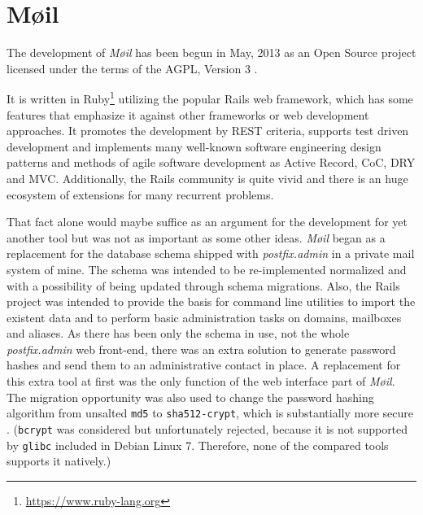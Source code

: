 \documentclass[12pt,a4paper]{scrartcl}
\begin{document}
	\section*{Møil}
	\label{sec:moeil}
		The development of \emph{Møil} has been begun in May, 2013 as an Open
		Source project licensed under the terms of the AGPL, Version 3
		\cite{agpl}.

		
		It is written in Ruby\footnote{\url{https://www.ruby-lang.org}}
		utilizing the popular \ac{Rails} web framework, which has some features
		that emphasize it against other frameworks or web development
		approaches. It promotes the development by \acs{REST} \cite{rest}
		criteria, supports test driven development and implements many
		well-known software engineering design patterns and methods of agile
		software development as Active Record, \ac{CoC}, \ac{DRY} and \ac{MVC}.
		Additionally, the \ac{Rails} community is quite vivid and there is an
		huge ecosystem of extensions for many recurrent problems.
		\s


		That fact alone would maybe suffice as an argument for the development
		for yet another tool but was not as important as some other ideas.
		\emph{Møil} began as a replacement for the database schema shipped with
		\emph{postfix.admin} in a private mail system of mine. The schema was
		intended to be re-implemented normalized \cite{dbnorm} and with a
		possibility of being updated through schema migrations. Also, the
		\ac{Rails} project was intended to provide the basis for command line
		utilities to import the existent data and to perform basic
		administration tasks on domains, mailboxes and aliases. As there has
		been only the schema in use, not the whole \emph{postfix.admin} web
		front-end, there was an extra solution to generate password hashes and
		send them to an administrative contact in place. A replacement for this
		extra tool at first was the only function of the web interface part of
		\emph{Møil}. The migration opportunity was also used to change the
		password hashing algorithm from unsalted \texttt{md5} to
		\texttt{sha512-crypt}, which is substantially more secure
		\cite{missing}. (\texttt{bcrypt} was considered but unfortunately
		rejected, because it is not supported by \texttt{glibc} included in
		Debian Linux 7. Therefore, none of the compared tools supports it
		natively.)
\end{document}
